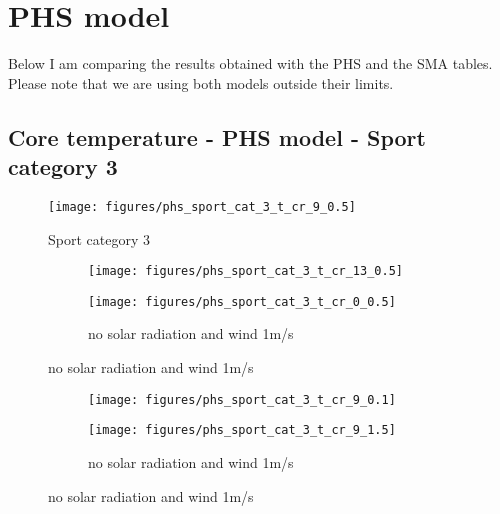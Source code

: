 \documentclass[11pt]{article}
\begin{document}
    \section{PHS model}\label{sec:phs-model}

    Below I am comparing the results obtained with the PHS and the SMA tables.
    Please note that we are using both models outside their limits.

    \subsection{Core temperature - PHS model - Sport category 3}
    \begin{figure}[htb!]
        \centering
        \texttt{[image: figures/phs\_sport\_cat\_3\_t\_cr\_9\_0.5]}
        \caption{Sport category 3}\label{fig:phs_sport_cat_3}
    \end{figure}

    \clearpage

    \begin{figure}[htb!]
        \centering

        \begin{subfigure}{\textwidth}
            \centering
            \texttt{[image: figures/phs\_sport\_cat\_3\_t\_cr\_13\_0.5]}
            \caption{}\label{fig:phs_sport_cat_3_t_cr_20_2}
        \end{subfigure}%
        \hfill
        \begin{subfigure}{\textwidth}
            \centering
            \texttt{[image: figures/phs\_sport\_cat\_3\_t\_cr\_0\_0.5]}
            \caption{no solar radiation and wind 1m/s}\label{fig:phs_sport_cat_3_t_cr_0_1}
        \end{subfigure}%

    \end{figure}

    \begin{figure}[htb!]
        \centering

        \begin{subfigure}{\textwidth}
            \centering
            \texttt{[image: figures/phs\_sport\_cat\_3\_t\_cr\_9\_0.1]}
            \caption{}\label{fig:phs_sport_cat_3_t_cr_9_0}
        \end{subfigure}%
        \hfill
        \begin{subfigure}{\textwidth}
            \centering
            \texttt{[image: figures/phs\_sport\_cat\_3\_t\_cr\_9\_1.5]}
            \caption{no solar radiation and wind 1m/s}\label{fig:phs_sport_cat_3_t_cr_9_1}
        \end{subfigure}%

    \end{figure}
\end{document}
